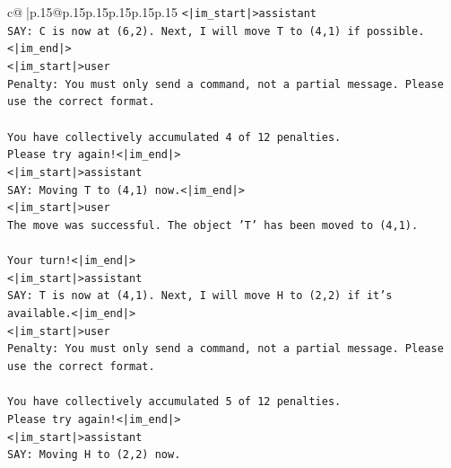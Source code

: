 \documentclass{article}
\begin{document}
{\begin{supertabular}{c@{$\;$}|p{.15\linewidth}@{}p{.15\linewidth}p{.15\linewidth}p{.15\linewidth}p{.15\linewidth}p{.15\linewidth}}
{{{\texttt{<|im\_start|>assistant} \\
\texttt{SAY: C is now at (6,2). Next, I will move T to (4,1) if possible.<|im\_end|>} \\
\texttt{<|im\_start|>user} \\
\texttt{Penalty: You must only send a command, not a partial message. Please use the correct format.} \\
\\ 
\texttt{You have collectively accumulated 4 of 12 penalties.} \\
\texttt{Please try again!<|im\_end|>} \\
\texttt{<|im\_start|>assistant} \\
\texttt{SAY: Moving T to (4,1) now.<|im\_end|>} \\
\texttt{<|im\_start|>user} \\
\texttt{The move was successful. The object 'T' has been moved to (4,1).} \\
\\ 
\texttt{Your turn!<|im\_end|>} \\
\texttt{<|im\_start|>assistant} \\
\texttt{SAY: T is now at (4,1). Next, I will move H to (2,2) if it's available.<|im\_end|>} \\
\texttt{<|im\_start|>user} \\
\texttt{Penalty: You must only send a command, not a partial message. Please use the correct format.} \\
\\ 
\texttt{You have collectively accumulated 5 of 12 penalties.} \\
\texttt{Please try again!<|im\_end|>} \\
\texttt{<|im\_start|>assistant} \\
\texttt{SAY: Moving H to (2,2) now.} \\
            }
        }
    }
     \\ \\


\end{supertabular}}
\end{document}
